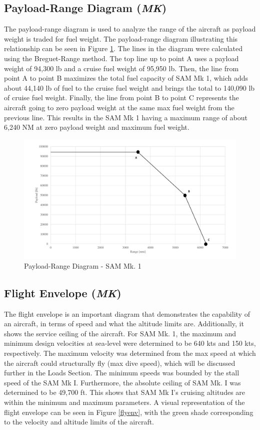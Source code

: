 \subsection{Payload-Range Diagram (\textit{MK})}
The payload-range diagram is used to analyze the range of the aircraft as payload weight is traded for fuel weight. The payload-range diagram illustrating this relationship can be seen in Figure \ref{payrang}. The lines in the diagram were calculated using the Breguet-Range method. The top line up to point A uses a payload weight of 94,300 lb and a cruise fuel weight of 95,950 lb. Then, the line from point A to point B maximizes the total fuel capacity of SAM Mk 1, which adds about 44,140 lb of fuel to the cruise fuel weight and brings the total to 140,090 lb of cruise fuel weight. Finally, the line from point B to point C represents the aircraft going to zero payload weight at the same max fuel weight from the previous line. This results in the SAM Mk 1 having a maximum range of about 6,240 NM at zero payload weight and maximum fuel weight.

\begin{figure}[H]
    \centering
    \includegraphics[width=1.0\textwidth]{Photos/Payload_Range.pdf}
    \caption{Payload-Range Diagram -  SAM Mk. 1}
    \label{payrang}
 \end{figure}

\subsection{Flight Envelope (\textit{MK})}
\label{ssfl}
The flight envelope is an important diagram that demonstrates the capability of an aircraft, in terms of speed and what the altitude limits are. Additionally, it shows the service ceiling of the aircraft. For SAM Mk. 1, the maximum and minimum design velocities at sea-level were determined to be 640 kts and 150 kts, respectively. The maximum velocity was determined from the max speed at which the aircraft could structurally fly (max dive speed), which will be discussed further in the Loads Section. The minimum speeds was bounded by the stall speed of the SAM Mk I. Furthermore, the absolute ceiling of SAM Mk. I was determined to be 49,700 ft. This shows that SAM Mk I's cruising altitudes are within the minimum and maximum parameters. A visual representation of the flight envelope can be seen in Figure \ref{flyenv}, with the green shade corresponding to the velocity and altitude limits of the aircraft. 

